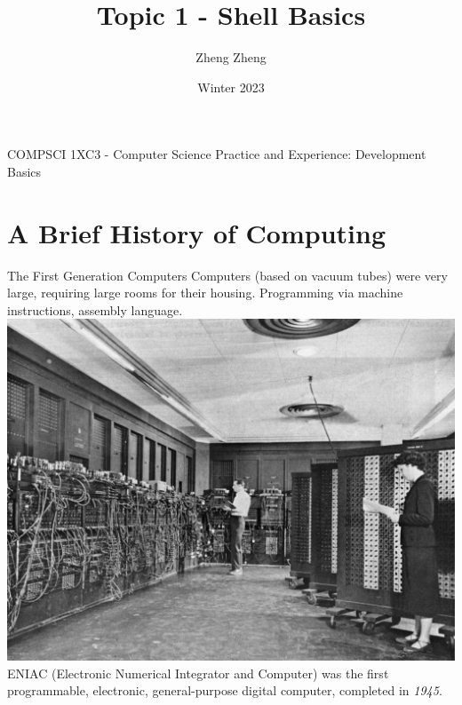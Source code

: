 \documentclass[11pt]{beamer}
\author{Zheng Zheng}
\title{Topic 1 - Shell Basics}
\institute{McMaster University}
\date{Winter 2023}
\begin{document}
\begin{frame}
\center
COMPSCI 1XC3 - Computer Science Practice and Experience:
Development Basics
\titlepage
\end{frame}

\begin{frame}
\tableofcontents
\end{frame}

\section[History]{A Brief History of Computing}
\begin{frame}{The First Generation Computers}
Computers (based on vacuum tubes) were very large, requiring large rooms for their housing. Programming via machine instructions, assembly language.
\center
\includegraphics[scale=0.1]{eniac.jpg} \\
ENIAC (Electronic Numerical Integrator and Computer) was the first programmable, electronic, general-purpose digital computer, completed in \emph{1945}.
\end{frame}
\end{document}
